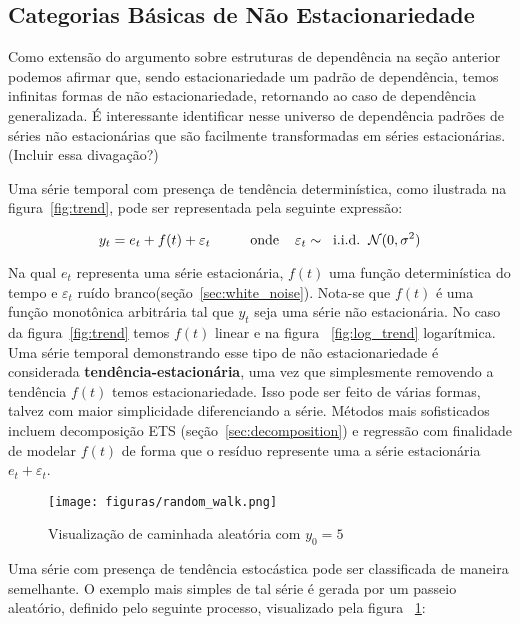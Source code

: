 \subsection{Categorias Básicas de Não Estacionariedade}\label{ssec:taxonomy}

Como extensão do argumento sobre estruturas de dependência na seção anterior
podemos afirmar que, sendo estacionariedade um padrão de dependência, temos
infinitas formas de não estacionariedade, retornando ao caso de dependência
generalizada. É interessante identificar nesse universo de dependência padrões
de séries não estacionárias que são facilmente transformadas em séries
estacionárias. (Incluir essa divagação?)

Uma série temporal com presença de tendência determinística, como ilustrada na
figura~\ref{fig:trend}, pode ser representada pela seguinte expressão:

$$  y_t = e_t + f(t) + \varepsilon_t  \hspace{1cm}\text{onde} \hspace{.4cm}\varepsilon_t \sim \hspace{.2cm}\text{i.i.d.} \hspace{.2cm}\mathcal{N}(0, \sigma^2)$$

Na qual $e_t$ representa uma série estacionária, $f(t)$ uma função
determinística do tempo e $\varepsilon_t$ ruído
branco(seção~\ref{sec:white_noise}). Nota-se que $f(t)$ é uma função
monotônica arbitrária tal que $y_t$ seja uma série não estacionária. No caso da
figura~\ref{fig:trend} temos $f(t)$ linear e na figura ~\ref{fig:log_trend}
logarítmica. Uma série temporal demonstrando esse tipo de não estacionariedade
é considerada \textbf{tendência-estacionária}, uma vez que simplesmente
removendo a tendência $f(t)$ temos estacionariedade. Isso pode ser feito de
várias formas, talvez com maior simplicidade diferenciando a série. Métodos
mais sofisticados incluem decomposição ETS (seção~\ref{sec:decomposition}) e
regressão com finalidade de modelar $f(t)$ de forma que o resíduo represente
uma a série estacionária $e_t + \varepsilon_t$.

\begin{figure}[h]
    \centering
    \texttt{[image: figuras/random\_walk.png]}
    \caption{Visualização de caminhada aleatória com $y_0=5$}
    \label{fig:random_walk}
\end{figure}

Uma série com presença de tendência estocástica pode ser classificada de
maneira semelhante. O exemplo mais simples de tal série é gerada por um
passeio aleatório, definido pelo seguinte processo, visualizado pela figura
~\ref{fig:random_walk}:

